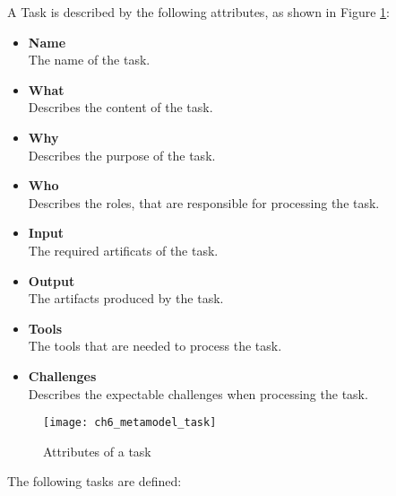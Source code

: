 A Task is described by the following attributes, as shown in Figure \ref{fig:ch6_metamodel_task}:
\begin{itemize}
	\item \textbf{Name}\\
	The name of the task.
	\item \textbf{What}\\
	Describes the content of the task.
	\item \textbf{Why}\\
	Describes the purpose of the task. 
	\item \textbf{Who}\\
	Describes the roles, that are responsible for processing the task.
	\item \textbf{Input}\\
	The required artificats of the task.
	\item \textbf{Output}\\
	The artifacts produced by the task.
	\item \textbf{Tools}\\
	The tools that are needed to process the task.
	\item \textbf{Challenges}\\
	Describes the expectable challenges when processing the task.
\end{itemize}

\begin{figure}[htpb] \centering 
	\texttt{[image: ch6\_metamodel\_task]} 
	\caption{Attributes of a task} 
	\label{fig:ch6_metamodel_task} 
\end{figure}

The following tasks are defined:

